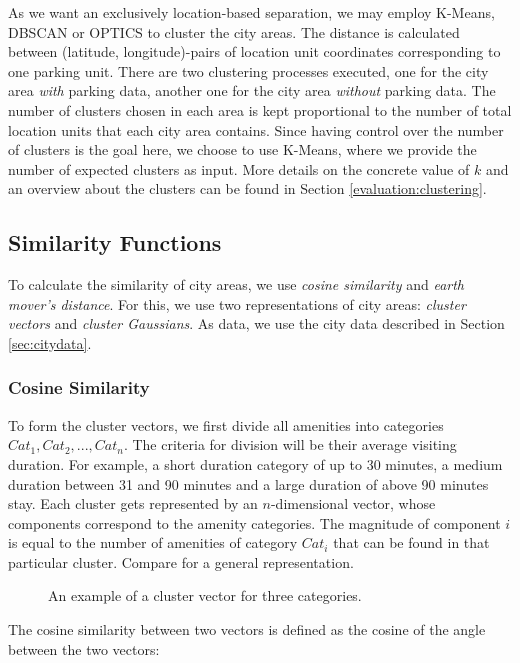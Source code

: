 As we want an exclusively location-based separation, we may employ K-Means, DBSCAN or OPTICS to cluster the city areas. The distance is calculated between (latitude, longitude)-pairs of location unit coordinates corresponding to one parking unit. There are two clustering processes executed, one for the city area \textit{with} parking data, another one for the city area \textit{without} parking data. The number of clusters chosen in each area is kept proportional to the number of total location units that each city area contains. Since having control over the number of clusters is the goal here, we choose to use K-Means, where we provide the number of expected clusters as input. More details on the concrete value of $k$ and an overview about the clusters can be found in Section \ref{evaluation:clustering}.

\subsection{Similarity Functions}
To calculate the similarity of city areas, we use \textit{cosine similarity} and \textit{earth mover's distance}. For this, we use two representations of city areas: \textit{cluster vectors} and \textit{cluster Gaussians}. As data, we use the city data described in Section \ref{sec:citydata}.

\subsubsection{Cosine Similarity}
\label{realization:vectors}
To form the cluster vectors, we first divide all amenities into categories $Cat_1, Cat_2, ..., Cat_n$.
The criteria for division will be their average visiting duration.
For example, a short duration category of up to 30 minutes, a medium duration between 31 and 90 minutes and a large duration of above 90 minutes stay.
Each cluster gets represented by an $n$-dimensional vector, whose components correspond to the amenity categories.
The magnitude of component $i$ is equal to the number of amenities of category $Cat_i$ that can be found in that particular cluster.
Compare  for a general representation.

\begin{figure}[!ht]
	\centering
	
	\caption{An example of a cluster vector for three categories.}
	\label{fig:cluster_vector}
\end{figure}
\label{realization:cosine_similarity}
The cosine similarity between two vectors is defined as the cosine of the angle between the two vectors:

